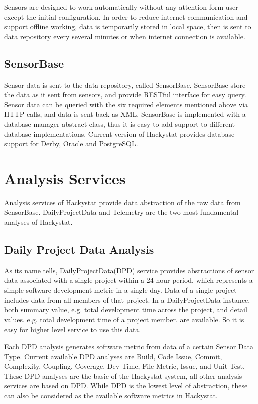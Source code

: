 Sensors are designed to work automatically without any attention form user except the initial configuration. In order to reduce internet communication and support offline working, data is temporarily stored in local space, then is sent to data repository every several minutes or when internet connection is available.

\subsection{SensorBase}
Sensor data is sent to the data repository, called SensorBase. SensorBase store the data as it sent from sensors, and provide RESTful interface for easy query. Sensor data can be queried with the six required elements mentioned above via HTTP calls, and data is sent back as XML. SensorBase is implemented with a database manager abstract class, thus it is easy to add support to different database implementations. Current version of Hackystat provides database support for Derby, Oracle and PostgreSQL.

\section{Analysis Services}
Analysis services of Hackystat provide data abstraction of the raw data from SensorBase. DailyProjectData and Telemetry are the two most fundamental analyses of Hackystat.

\subsection{Daily Project Data Analysis}
As its name tells, DailyProjectData(DPD) service provides abstractions of sensor data associated with a single project within a 24 hour period, which represents a simple software development metric in a single day. Data of a single project includes data from all members of that project. In a DailyProjectData instance, both summary value, e.g. total development time across the project, and detail values, e.g. total development time of a project member, are available. So it is easy for higher level service to use this data.

Each DPD analysis generates software metric from data of a certain Sensor Data Type. Current available DPD analyses are Build, Code Issue, Commit, Complexity, Coupling, Coverage, Dev Time, File Metric, Issue, and Unit Test. These DPD analyses are the basic of the Hackystat system, all other analysis services are based on DPD. While DPD is the lowest level of abstraction, these can also be considered as the available software metrics in Hackystat.


